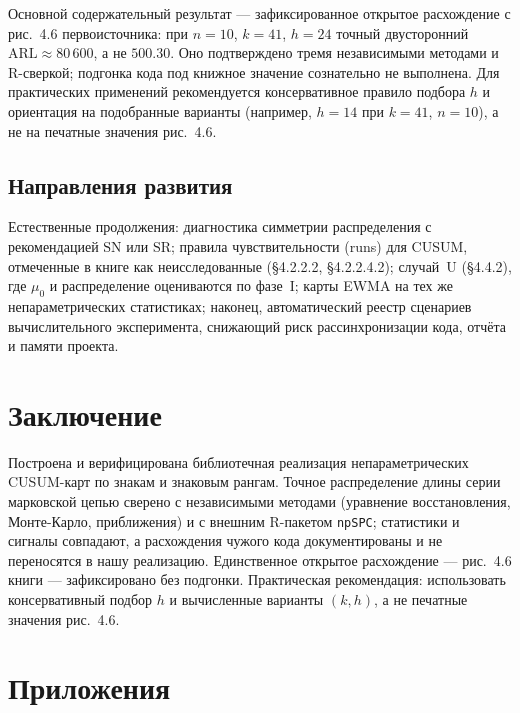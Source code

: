 \documentclass[11pt,a4paper]{article}
\newcommand{\SN}{\mathrm{SN}}
\newcommand{\SR}{\mathrm{SR}}
\newcommand{\ARL}{\mathrm{ARL}}
\begin{document}
Основной содержательный результат --- зафиксированное открытое расхождение
с рис.~4.6 первоисточника: при $n=10$, $k=41$, $h=24$ точный двусторонний
$\ARL\approx80\,600$, а не $500.30$. Оно подтверждено тремя независимыми
методами и R-сверкой; подгонка кода под книжное значение сознательно не
выполнена. Для практических применений рекомендуется консервативное
правило подбора $h$ и ориентация на подобранные варианты
(например, $h=14$ при $k=41$, $n=10$), а не на печатные значения рис.~4.6.

\subsection{Направления развития}
\label{sec:future}

Естественные продолжения: диагностика симметрии распределения с
рекомендацией $\SN$ или $\SR$; правила чувствительности (runs) для CUSUM,
отмеченные в книге как неисследованные (\S4.2.2.2, \S4.2.2.4.2);
случай~U (\S4.4.2), где $\mu_0$ и распределение оцениваются по фазе~I;
карты EWMA на тех же непараметрических статистиках; наконец,
автоматический реестр сценариев вычислительного эксперимента, снижающий
риск рассинхронизации кода, отчёта и памяти проекта.

\section{Заключение}
\label{sec:conclusion}

Построена и верифицирована библиотечная реализация непараметрических
CUSUM-карт по знакам и знаковым рангам. Точное распределение длины серии
марковской цепью сверено с независимыми методами (уравнение
восстановления, Монте-Карло, приближения) и с внешним R-пакетом
\texttt{npSPC}; статистики и сигналы совпадают, а расхождения чужого кода
документированы и не переносятся в нашу реализацию. Единственное
открытое расхождение --- рис.~4.6 книги --- зафиксировано без подгонки.
Практическая рекомендация: использовать консервативный подбор $h$ и
вычисленные варианты $(k,h)$, а не печатные значения рис.~4.6.

\appendix
\section{Приложения}
\label{sec:appendix}
\end{document}
